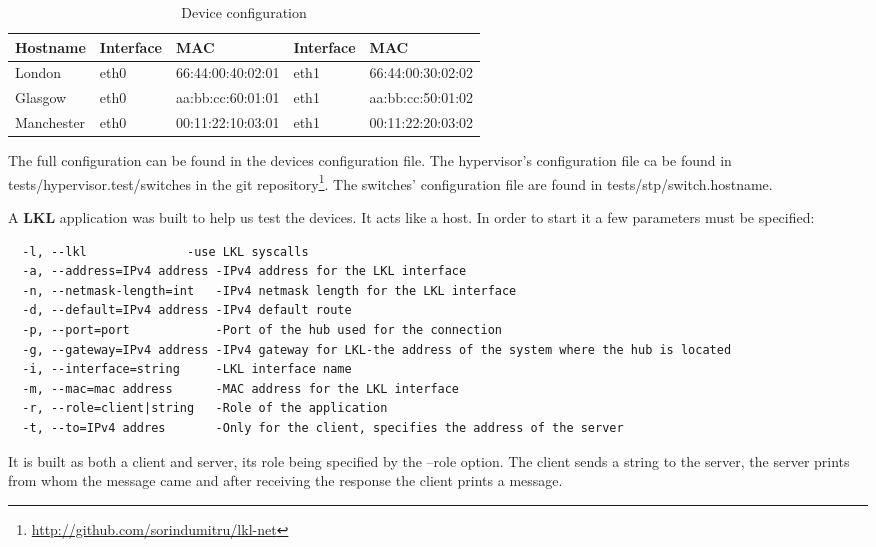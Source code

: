 
\begin{center}
  \begin{table}[htb]
  \begin{center}
  \begin{tabular}{| l | l | l | l | l |}
    \hline
      \textbf{Hostname} & \textbf{Interface} & \textbf{MAC} & \textbf{Interface} & \textbf{MAC} \\ \hline
      London & eth0 & 66:44:00:40:02:01 & eth1 & 66:44:00:30:02:02 \\ \hline
      Glasgow & eth0 & aa:bb:cc:60:01:01 & eth1 & aa:bb:cc:50:01:02 \\ \hline
      Manchester & eth0 & 00:11:22:10:03:01 & eth1 & 00:11:22:20:03:02 \\
    \hline
  \end{tabular}
  \end{center}
  \caption{Device configuration}
  \label{table:tdevices}
  \end{table}
\end{center}

The full configuration can be found in the devices configuration file. The hypervisor's configuration file
ca be found in tests/hypervisor.test/switches in the git repository\footnote{\url{http://github.com/sorindumitru/lkl-net}}.
The switches' configuration file are found in tests/stp/switch.hostname.

A \textbf{LKL} application was built to help us test the devices. It acts like a host. In order to start it
a few parameters must be specified:
\lstset{language=text, caption=Host options}
\begin{lstlisting} 
  -l, --lkl 		     -use LKL syscalls
  -a, --address=IPv4 address -IPv4 address for the LKL interface
  -n, --netmask-length=int   -IPv4 netmask length for the LKL interface
  -d, --default=IPv4 address -IPv4 default route
  -p, --port=port            -Port of the hub used for the connection
  -g, --gateway=IPv4 address -IPv4 gateway for LKL-the address of the system where the hub is located
  -i, --interface=string     -LKL interface name
  -m, --mac=mac address      -MAC address for the LKL interface
  -r, --role=client|string   -Role of the application
  -t, --to=IPv4 addres       -Only for the client, specifies the address of the server
\end{lstlisting}
It is built as both a client and server, its role being specified by the --role option. The client
sends a string to the server, the server prints from whom the message came and after receiving the response
the client prints a message.

